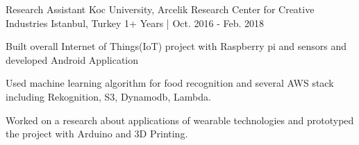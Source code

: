 \begin{cventries}
  \cventry
    {Research Assistant} %
    {Koc University, Arcelik Research Center for Creative Industries} %
    {Istanbul, Turkey} %
    {1+ Years | Oct. 2016 - Feb. 2018} %
    {
      \begin{cvitems} %
       	\item {Built overall Internet of Things(IoT) project with Raspberry pi and sensors and developed Android Application}
       	\item {Used machine learning algorithm for food recognition and several AWS stack including Rekognition, S3, Dynamodb, Lambda.} 
         \item {Worked on a research about applications of wearable technologies and prototyped the project with Arduino and 3D Printing.  }
      \end{cvitems}
    }
\begin{comment}
  \cventry
    {Work \& Study} %
    {Koc University, Computer Information Technology Department} %
    {Istanbul, Turkey} %
    {OCt. 2015 - May. 2016} %
    {
      \begin{cvitems} %
        \item {Applied and tested Google Cloud technologies across the campus.}
      \end{cvitems}
    }

\end{comment}
\end{cventries}
